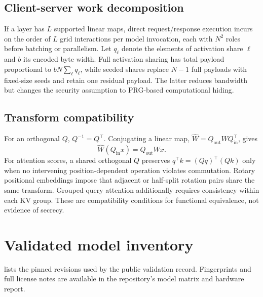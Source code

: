 \subsection{Client-server work decomposition}

If a layer has $L$ supported linear maps, direct request/response execution incurs on the order of $L$ grid interactions per model invocation, each with $N^2$ roles before batching or parallelism. Let $q_\ell$ denote the elements of activation share $\ell$ and $b$ its encoded byte width. Full activation sharing has total payload proportional to $bN\sum_\ell q_\ell$, while seeded shares replace $N-1$ full payloads with fixed-size seeds and retain one residual payload. The latter reduces bandwidth but changes the security assumption to PRG-based computational hiding.

\subsection{Transform compatibility}

For an orthogonal $Q$, $Q^{-1}=Q^\top$. Conjugating a linear map, $\widehat{W}=Q_{\mathrm{out}}WQ_{\mathrm{in}}^\top$, gives
\begin{equation}
\widehat{W}(Q_{\mathrm{in}}x)=Q_{\mathrm{out}}Wx.
\end{equation}
For attention scores, a shared orthogonal $Q$ preserves $q^\top k=(Qq)^\top(Qk)$ only when no intervening position-dependent operation violates commutation. Rotary positional embeddings impose that adjacent or half-split rotation pairs share the same transform. Grouped-query attention additionally requires consistency within each KV group. These are compatibility conditions for functional equivalence, not evidence of secrecy.

\section{Validated model inventory}\label{app:models}

 lists the pinned revisions used by the public validation record. Fingerprints and full license notes are available in the repository's model matrix and hardware report.

